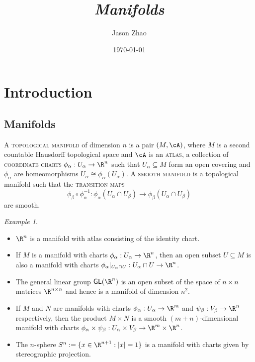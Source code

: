 \documentclass[reqno]{amsart}
\title
{
	\emph{Manifolds}
}
\author{Jason Zhao}
\date{\today}
\theoremstyle{definition}
\theoremstyle{remark}
\newtheorem*{example}{Example}
\renewcommand{\emph}{\textsc}
\begin{document}
\maketitle
\tableofcontents

\section{Introduction}



\subsection{Manifolds}

A \emph{topological manifold} of dimension $n$ is a pair $(M, \cA)$, where $M$ is a second countable Hausdorff topological space and $\cA$ is an \emph{atlas}, a collection of \emph{coordinate charts} $\phi_\alpha : U_\alpha \to \R^n$ such that $U_\alpha \subseteq M$ form an open covering and $\phi_\alpha$ are homeomorphisms $U_\alpha \cong \phi_\alpha (U_\alpha)$. A \emph{smooth manifold} is a topological manifold such that the \emph{transition maps}
	\[ \phi_\beta \circ \phi_\alpha^{-1} : \phi_\alpha (U_\alpha \cap U_\beta) \to \phi_\beta (U_\alpha \cap U_\beta) \]
are smooth. 

\begin{example}
\leavevmode
\begin{itemize}
	\item $\R^n$ is a manifold with atlas consisting of the identity chart. 
	
	\item If $M$ is a manifold with charts $\phi_\alpha : U_\alpha \to \R^n$, then an open subset $U \subseteq M$ is also a manifold with charts $\phi_\alpha |_{U_\alpha \cap U} : U_\alpha \cap U \to \R^n$. 
	
	\item The general linear group $\mathsf{GL} (\R^n)$ is an open subset of the space of $n \times n$ matrices $\R^{n \times n}$ and hence is a manifold of dimension $n^2$. 
	
	\item If $M$ and $N$ are manifolds with charts $\phi_\alpha : U_\alpha \to \R^m$ and $\psi_\beta : V_\beta \to \R^n$ respectively, then the product $M \times N$ is a smooth $(m + n)$-dimensional manifold with charts $\phi_\alpha \times \psi_\beta : U_\alpha \times V_\beta \to \R^m \times \R^n$. 
	
	\item The $n$-sphere $S^n := \{ x \in \R^{n + 1} : |x| = 1 \}$ is a manifold with charts given by stereographic projection. 

\end{itemize}
\end{example}
\end{document}

